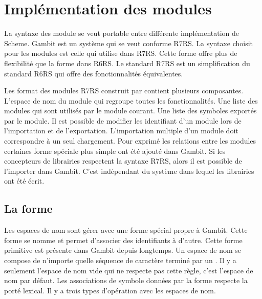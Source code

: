 
\chapter{Implémentation des modules}
\label{ch:modules_implementation}

La syntaxe des module se veut portable entre différente implémentation de
Scheme.  Gambit est un système qui se veut conforme R7RS.  La syntaxe choisit
pour les modules est celle qui utilise  dans R7RS.
Cette forme offre plus de flexibilité que la forme  dans R6RS.
Le standard R7RS est un simplification du standard R6RS qui offre des
fonctionnalités équivalentes.

Les format des modules R7RS construit par  contient
plusieurs composantes. L'espace de nom du module qui regroupe toutes les
fonctionnalités. Une liste des modules qui sont utilisés par le module courant.
Une liste des symboles exportés par le module. Il est possible de modifier les
identifiant d'un module lors de l'importation et de l'exportation.
L'importation multiple d'un module doit correspondre à un seul chargement.
Pour exprimé les relations entre les modules certaines forme spéciale plus
simple ont été ajouté dans Gambit.  Si les concepteurs de librairies respectent
la syntaxe R7RS, alors il est possible de l'importer dans Gambit. C'est indépendant
du système dans lequel les librairies ont été écrit.





\section{La forme }

Les espaces de nom sont gérer avec une forme spécial propre à Gambit. Cette
forme se nomme  et permet d'associer des identifiants à
d'autre.  Cette forme primitive est présente dans Gambit depuis longtemps.  Un
espace de nom se compose de n'importe quelle séquence de caractère terminé par
un \lstcode{#}. Il y a seulement l'espace de nom vide qui ne respecte pas cette
règle, c'est l'espace de nom par défaut.  Les associations de symbole données
par la forme  respecte la porté lexical. Il y a trois
types d'opération avec les espaces de nom.

